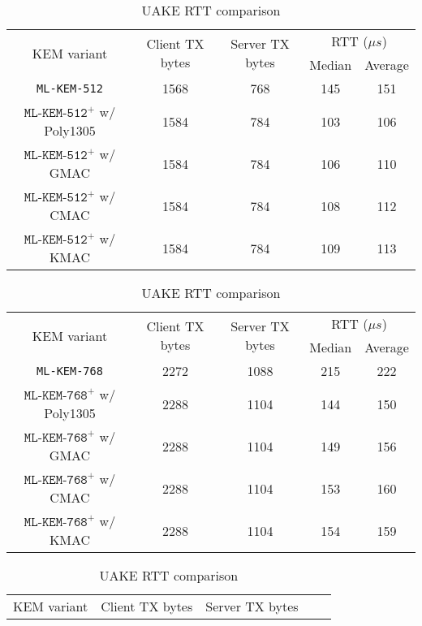 \documentclass[journal=tches,submission]{iacrtrans}
\newcommand{\us}{\mu s}
\begin{document}
\begin{table}[h]
    \centering
    \footnotesize
    \caption{UAKE RTT comparison}\label{tbl:uake-rtt}
    \begin{tabular}{|c|c|c|c|c|}
        \hline
        \multirow{2}{*}{KEM variant}
        & \multirow{2}{*}{Client TX bytes}
        & \multirow{2}{*}{Server TX bytes}
        & \multicolumn{2}{|c|}{RTT ($\us$)} \\
        \cline{4-5}
        & & & Median & Average \\
        \hline
        \texttt{ML-KEM-512} & 1568 & 768 & 145 & 151 \\
        \hline
        $\texttt{ML-KEM-512}^+$ w/ Poly1305 & 1584 & 784 & 103 & 106 \\
        \hline
        $\texttt{ML-KEM-512}^+$ w/ GMAC & 1584 & 784 & 106 & 110 \\
        \hline
        $\texttt{ML-KEM-512}^+$ w/ CMAC & 1584 & 784 & 108 & 112 \\
        \hline
        $\texttt{ML-KEM-512}^+$ w/ KMAC & 1584 & 784 & 109 & 113 \\
        \hline
    \end{tabular}\vspace{0.3cm}
    \begin{tabular}{|c|c|c|c|c|}
        \hline
        \multirow{2}{*}{KEM variant}
        & \multirow{2}{*}{Client TX bytes}
        & \multirow{2}{*}{Server TX bytes}
        & \multicolumn{2}{|c|}{RTT ($\us$)} \\
        \cline{4-5}
        & & & Median & Average \\
        \hline
        \texttt{ML-KEM-768} & 2272 & 1088 & 215 & 222 \\
        \hline
        $\texttt{ML-KEM-768}^+$ w/ Poly1305 & 2288 & 1104 & 144 & 150 \\
        \hline
        $\texttt{ML-KEM-768}^+$ w/ GMAC & 2288 & 1104 & 149 & 156 \\
        \hline
        $\texttt{ML-KEM-768}^+$ w/ CMAC & 2288 & 1104 & 153 & 160 \\
        \hline
        $\texttt{ML-KEM-768}^+$ w/ KMAC & 2288 & 1104 & 154 & 159 \\
        \hline
    \end{tabular}\vspace{0.3cm}
    \begin{tabular}{|c|c|c|c|c|}
        \hline
        \multirow{2}{*}{KEM variant}
        & \multirow{2}{*}{Client TX bytes}
        & \multirow{2}{*}{Server TX bytes}

\end{tabular}
\end{table}
\end{document}
